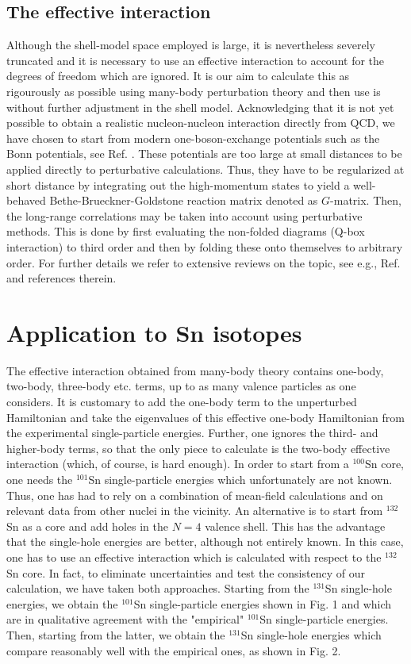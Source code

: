 \documentclass{ws-p8-50x6-00}
\begin{document}
\subsection{The effective interaction}
Although the shell-model space employed is large, it is 
nevertheless severely truncated and it is necessary to use an 
effective interaction to account for the degrees of freedom 
which are ignored. It is our aim to calculate this as rigourously 
as possible using many-body perturbation theory and then use is 
without further adjustment in the shell model. Acknowledging 
that it is not yet possible to obtain a realistic 
nucleon-nucleon interaction directly from QCD, we have chosen 
to start from modern one-boson-exchange potentials such as the 
Bonn potentials, see Ref. \cite{ruprecht}. These potentials are too large at small distances 
to be applied directly to perturbative calculations. Thus, they have 
to be regularized at short distance by integrating out the 
high-momentum states to yield a well-behaved Bethe-Brueckner-Goldstone 
reaction matrix denoted as $G$-matrix. Then, the long-range 
correlations may be taken into account using perturbative methods. 
This is done by first evaluating the non-folded diagrams 
(Q-box interaction) to third order and then by folding these 
onto themselves to arbitrary order. For further details we 
refer to extensive reviews on the topic, see e.g.,  Ref. \cite{hko95}
and references therein.

\section{Application to Sn isotopes}
The effective interaction obtained from many-body theory 
contains one-body, two-body, three-body etc. terms, up to as 
many valence particles as one considers. It is customary to add 
the one-body term to the unperturbed Hamiltonian and take the 
eigenvalues of this effective one-body Hamiltonian from the 
experimental single-particle energies. Further, one ignores the 
third- and higher-body terms, so that the only piece to calculate 
is the two-body effective interaction (which, of course, is hard enough). 
In order to start from a $^{100}$Sn core, one needs the $^{101}$Sn single-particle 
energies which unfortunately are not known. Thus, one has had to rely 
on a combination of mean-field calculations and on relevant data 
from other nuclei in the vicinity. An alternative is to start from $^{132}$Sn 
as a core and add holes in the $N = 4$ valence shell. This has the 
advantage that the single-hole energies are better, although not 
entirely known. In this case, one has to use an effective 
interaction which is calculated with respect to the $^{132}$Sn core. 
In fact, to eliminate uncertainties and test the consistency of our 
calculation, we have taken both approaches. Starting from the $^{131}$Sn 
single-hole energies, we obtain the $^{101}$Sn single-particle energies 
shown in Fig. 1 and which are in qualitative agreement with 
the "empirical" $^{101}$Sn single-particle energies. 
Then, starting from the latter, we obtain the $^{131}$Sn 
single-hole energies which compare reasonably well with the 
empirical ones, as shown in Fig. 2. 
\end{document}
